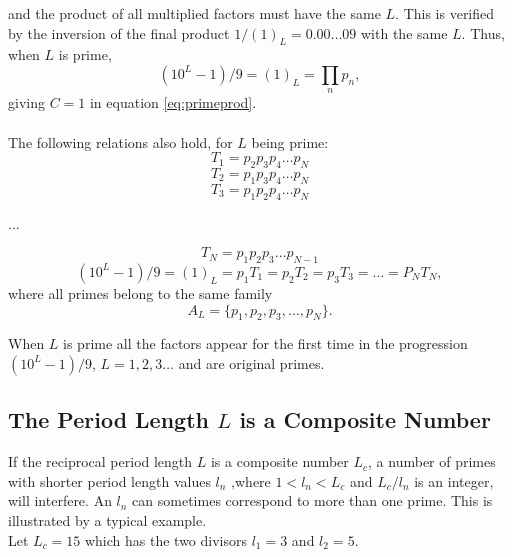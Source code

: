 \documentclass[10pt,twoside,a4paper]{amsart}
\begin{document}
and the product of all multiplied factors must have the same $L$. This is verified by the inversion of the final product $1/(1)_{L} = 0.00\ldots{}09$ with the same $L$. Thus, when $L$ is prime,
\begin{equation}
\label{eq:prodLprime}
(10^{L}-1)/9 = (1)_{L}=\prod_{n}p_{n},
\end{equation}
giving $C=1$ in equation \ref{eq:primeprod}.\\
\\
The following relations also hold, for $L$ being prime:
\begin{equation*}
T_{1} = p_{2}p_{3}p_{4}\ldots{}p_{N}
\end{equation*}
\begin{equation*}
T_{2} = p_{1}p_{3}p_{4}\ldots{}p_{N}
\end{equation*}
\begin{equation*}
T_{3} = p_{1}p_{2}p_{4}\ldots{}p_{N}
\end{equation*}
\begin{center}
$\ldots$
\end{center}
\begin{equation*}
T_{N} = p_{1}p_{2}p_{3}\ldots{}p_{N-1}
\end{equation*}
\begin{equation}
\label{eq:e}
(10^{L}-1)/9 = (1)_{L} = p_{1}T_{1}= p_{2}T_{2} = p_{3}T_{3} =\ldots{}=P_{N}T_{N},
\end{equation}
where all primes belong to the same family
\begin{equation}
\label{eq:f}
A_{L} = \{p_{1},p_{2},p_{3},\ldots{},p_{N}\}.
\end{equation}

When $L$ is prime all the factors appear for the first time in the progression $(10^{L} - 1)/9$, $L = 1,2,3\ldots$ and are original primes.

\subsection{The Period Length $L$ is a Composite Number}
\label{subsect:tplcn}
If the reciprocal period length $L$ is a composite number $L_{c}$, a number of primes with shorter period length values $l_{n}$ ,where $1<l_{n}<L_{c}$ and $L_{c}/l_{n}$ is an integer, will interfere. An $l_{n}$ can sometimes correspond to more than one prime. This is illustrated by a typical example.\\

Let $L_{c} = 15$ which has the two divisors $l_{1} = 3$ and $l_{2} = 5$.\\
\end{document}
